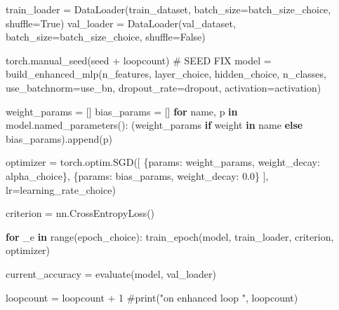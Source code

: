 \documentclass[
  letterpaper,
  DIV=11,
  numbers=noendperiod]{scrartcl}
\newenvironment{Shaded}{\begin{snugshade}}{\end{snugshade}}
\newcommand{\BuiltInTok}[1]{\textcolor[rgb]{0.00,0.23,0.31}{#1}}
\newcommand{\CommentTok}[1]{\textcolor[rgb]{0.37,0.37,0.37}{#1}}
\newcommand{\ControlFlowTok}[1]{\textcolor[rgb]{0.00,0.23,0.31}{\textbf{#1}}}
\newcommand{\DecValTok}[1]{\textcolor[rgb]{0.68,0.00,0.00}{#1}}
\newcommand{\FloatTok}[1]{\textcolor[rgb]{0.68,0.00,0.00}{#1}}
\newcommand{\KeywordTok}[1]{\textcolor[rgb]{0.00,0.23,0.31}{\textbf{#1}}}
\newcommand{\NormalTok}[1]{\textcolor[rgb]{0.00,0.23,0.31}{#1}}
\newcommand{\OperatorTok}[1]{\textcolor[rgb]{0.37,0.37,0.37}{#1}}
\newcommand{\StringTok}[1]{\textcolor[rgb]{0.13,0.47,0.30}{#1}}
\newcommand{\VariableTok}[1]{\textcolor[rgb]{0.07,0.07,0.07}{#1}}
\begin{document}
\begin{Shaded}
\begin{Highlighting}[]
\NormalTok{        train\_loader }\OperatorTok{=}\NormalTok{ DataLoader(train\_dataset, batch\_size}\OperatorTok{=}\NormalTok{batch\_size\_choice, shuffle}\OperatorTok{=}\VariableTok{True}\NormalTok{)}
\NormalTok{        val\_loader }\OperatorTok{=}\NormalTok{ DataLoader(val\_dataset, batch\_size}\OperatorTok{=}\NormalTok{batch\_size\_choice, shuffle}\OperatorTok{=}\VariableTok{False}\NormalTok{)}

\NormalTok{        torch.manual\_seed(seed }\OperatorTok{+}\NormalTok{ loopcount) }\CommentTok{\# SEED FIX}
\NormalTok{        model }\OperatorTok{=}\NormalTok{ build\_enhanced\_mlp(n\_features, layer\_choice, hidden\_choice, n\_classes,}
\NormalTok{                                  use\_batchnorm}\OperatorTok{=}\NormalTok{use\_bn, dropout\_rate}\OperatorTok{=}\NormalTok{dropout, activation}\OperatorTok{=}\NormalTok{activation)}

\NormalTok{        weight\_params }\OperatorTok{=}\NormalTok{ []}
\NormalTok{        bias\_params }\OperatorTok{=}\NormalTok{ []}
        \ControlFlowTok{for}\NormalTok{ name, p }\KeywordTok{in}\NormalTok{ model.named\_parameters():}
\NormalTok{            (weight\_params }\ControlFlowTok{if} \StringTok{\textquotesingle{}weight\textquotesingle{}} \KeywordTok{in}\NormalTok{ name }\ControlFlowTok{else}\NormalTok{ bias\_params).append(p)}

\NormalTok{        optimizer }\OperatorTok{=}\NormalTok{ torch.optim.SGD([}
\NormalTok{            \{}\StringTok{\textquotesingle{}params\textquotesingle{}}\NormalTok{: weight\_params, }\StringTok{\textquotesingle{}weight\_decay\textquotesingle{}}\NormalTok{: alpha\_choice\},}
\NormalTok{            \{}\StringTok{\textquotesingle{}params\textquotesingle{}}\NormalTok{: bias\_params, }\StringTok{\textquotesingle{}weight\_decay\textquotesingle{}}\NormalTok{: }\FloatTok{0.0}\NormalTok{\}}
\NormalTok{        ], lr}\OperatorTok{=}\NormalTok{learning\_rate\_choice)}

\NormalTok{        criterion }\OperatorTok{=}\NormalTok{ nn.CrossEntropyLoss()}

        \ControlFlowTok{for}\NormalTok{ \_e }\KeywordTok{in} \BuiltInTok{range}\NormalTok{(epoch\_choice):}
\NormalTok{            train\_epoch(model, train\_loader, criterion, optimizer)}

\NormalTok{        current\_accuracy }\OperatorTok{=}\NormalTok{ evaluate(model, val\_loader)}

\NormalTok{        loopcount }\OperatorTok{=}\NormalTok{ loopcount }\OperatorTok{+} \DecValTok{1}
        \CommentTok{\#print("on enhanced loop ", loopcount)}


\end{Highlighting}
\end{Shaded}
\end{document}
